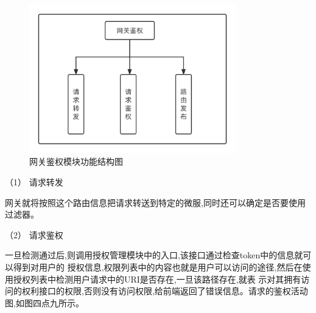 \begin{figure}[htb]
    \centering
    \includegraphics[width=0.8\textwidth]{my_figures/chapter4/网关鉴权模块功能结构图.png}
    \caption{网关鉴权模块功能结构图}
    \label{fig:网关鉴权模块功能结构图}
\end{figure}

（1） 请求转发


网关就将按照这个路由信息把请求转送到特定的微服,同时还可以确定是否要使用过滤器。



（2） 请求鉴权


一旦检测通过后,则调用授权管理模块中的入口,该接口通过检查token中的信息就可以得到对用户的
授权信息,权限列表中的内容也就是用户可以访问的途径,然后在使用授权列表中检测用户请求中的URI是否存在,一旦该路径存在,就表
示对其拥有访问的权利接口的权限,否则没有访问权限,给前端返回了错误信息。请求的鉴权活动图,如图四点九所示。

